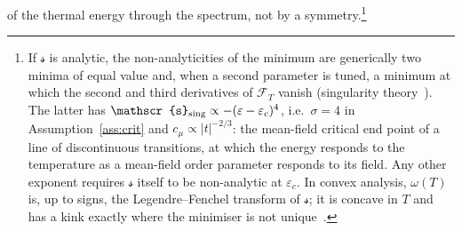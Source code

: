 \documentclass[10pt,a4paper]{article}
\theoremstyle{plain}
\newcommand{\Fen}[1][T]{\mathscr{F}_{#1}}  %
\newcommand{\lds}{\mathscr{s}}  %
\begin{document}
of the thermal energy through the spectrum, not by a symmetry.\footnote{If $\lds$
is analytic, the non-analyticities of the minimum are generically two minima of
equal value and, when a second parameter is tuned, a minimum at which the second and third derivatives of
$\Fen$ vanish (singularity theory~\cite{Arnold}). The latter has
$\lds_{\rm sing}\propto-(\varepsilon-\varepsilon_c)^{4}$, i.e.\ $\sigma=4$ in
Assumption~\ref{ass:crit} and $c_\mu\propto|t|^{-2/3}$: the mean-field
critical end point of a line of discontinuous transitions, at which the
energy responds to the temperature as a mean-field order parameter responds
to its field. Any other exponent requires $\lds$ itself to be non-analytic at
$\varepsilon_c$. In convex analysis, $\omega(T)$ is, up to signs, the
Legendre--Fenchel transform of $\lds$; it is concave in $T$ and has a kink
exactly where the minimiser is not unique~\cite{Rockafellar,Touchette2009}.}
\end{document}
